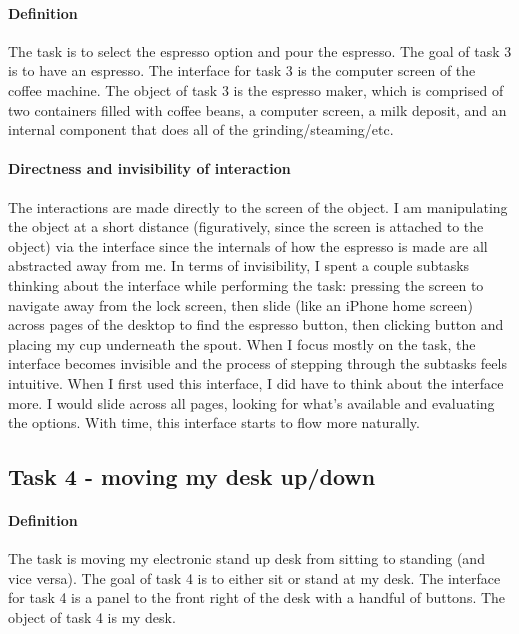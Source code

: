 \paragraph{Definition}
The task is to select the espresso option and pour the espresso. The goal of task 3 is to have an espresso. The interface for task 3 is the computer screen of the coffee machine. The object of task 3 is the espresso maker, which is comprised of two containers filled with coffee beans, a computer screen, a milk deposit, and an internal component that does all of the grinding/steaming/etc.

\paragraph{Directness and invisibility of interaction}
The interactions are made directly to the screen of the object. I am manipulating the object at a short distance (figuratively, since the screen is attached to the object) via the interface since the internals of how the espresso is made are all abstracted away from me. In terms of invisibility, I spent a couple subtasks thinking about the interface while performing the task: pressing the screen to navigate away from the lock screen, then slide (like an iPhone home screen) across pages of the desktop to find the espresso button, then clicking button and placing my cup underneath the spout. When I focus mostly on the task, the interface becomes invisible and the process of stepping through the subtasks feels intuitive. When I first used this interface, I did have to think about the interface more. I would slide across all pages, looking for what's available and evaluating the options. With time, this interface starts to flow more naturally.

\subsection{Task 4 - moving my desk up/down}

\paragraph{Definition}
The task is moving my electronic stand up desk from sitting to standing (and vice versa). The goal of task 4 is to either sit or stand at my desk. The interface for task 4 is a panel to the front right of the desk with a handful of buttons. The object of task 4 is my desk.


